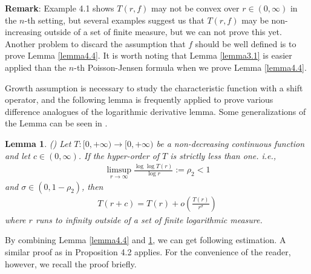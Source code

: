 \documentclass{article}
\newtheorem{lemma}[defin]{Lemma}
\begin{document}
\noindent\textbf{Remark}: Example 4.1 shows $T(r, f)$ may not be convex over $r\in(0, \infty)$ in the $n$-th setting, but several examples suggest us that $T(r, f)$ may be non-increasing outside of a set of finite measure, but we can not prove this yet. Another problem to discard the assumption that $f$ should be well defined is to prove Lemma \ref{lemma4.4}. It is worth noting that Lemma \ref{lemma3.1} is easier applied than the $n$-th Poisson-Jensen formula when we prove Lemma \ref{lemma4.4}.

Growth assumption is necessary to study the characteristic function with a shift operator, and the following lemma is frequently applied to prove various difference analogues of the logarithmic derivative lemma. Some generalizations of the Lemma can be seen in \cite{Thyp, Log}.

\begin{lemma}\label{lemma4.5}
    (\cite[Lemma 8.3]{Hyp}) Let $T:[0, +\infty)\rightarrow [0, +\infty)$ be a non-decreasing continuous function and let $c\in(0, \infty)$. If the hyper-order of $T$ is strictly less than one. i.e.,
    \begin{eqnarray}\label{4sup}
        \limsup\limits_{r\rightarrow \infty}\frac{\log\log T(r)}{\log r}:=\rho_{2}<1
    \end{eqnarray}
    and $\sigma\in(0, 1-\rho_{2})$, then
    \begin{eqnarray*}
        T(r+c)=T(r)+o\left(\frac{T(r)}{r^{\sigma}}\right)
    \end{eqnarray*}
    where $r$ runs to infinity outside of a set of finite logarithmic measure.
\end{lemma}


By combining Lemma \ref{lemma4.4} and \ref{lemma4.5}, we can get following estimation. A similar proof as in Proposition 4.2 \cite{Secm} applies. For the convenience of the reader, however, we recall the proof briefly.
\end{document}
